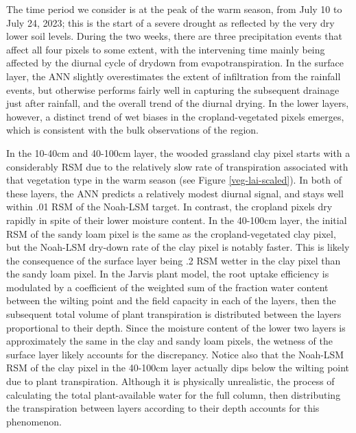 The time period we consider is at the peak of the warm season, from July 10 to July 24, 2023; this is the start of a severe drought as reflected by the very dry lower soil levels. During the two weeks, there are three precipitation events that affect all four pixels to some extent, with the intervening time mainly being affected by the diurnal cycle of drydown from evapotranspiration. In the surface layer, the ANN slightly overestimates the extent of infiltration from the rainfall events, but otherwise performs fairly well in capturing the subsequent drainage just after rainfall, and the overall trend of the diurnal drying. In the lower layers, however, a distinct trend of wet biases in the cropland-vegetated pixels emerges, which is consistent with the bulk observations of the region.

In the 10-40cm and 40-100cm layer, the wooded grassland clay pixel starts with a considerably RSM due to the relatively slow rate of transpiration associated with that vegetation type in the warm season (see Figure \ref{veg-lai-scaled}). In both of these layers, the ANN predicts a relatively modest diurnal signal, and stays well within .01 RSM of the Noah-LSM target. In contrast, the cropland pixels dry rapidly in spite of their lower moisture content. In the 40-100cm layer, the initial RSM of the sandy loam pixel is the same as the cropland-vegetated clay pixel, but the Noah-LSM dry-down rate of the clay pixel is notably faster. This is likely the consequence of the surface layer being .2 RSM wetter in the clay pixel than the sandy loam pixel. In the Jarvis plant model, the root uptake efficiency is modulated by a coefficient of the weighted sum of the fraction water content between the wilting point and the field capacity in each of the layers, then the subsequent total volume of plant transpiration is distributed between the layers proportional to their depth. Since the moisture content of the lower two layers is approximately the same in the clay and sandy loam pixels, the wetness of the surface layer likely accounts for the discrepancy. Notice also that the Noah-LSM RSM of the clay pixel in the 40-100cm layer actually dips below the wilting point due to plant transpiration. Although it is physically unrealistic, the process of calculating the total plant-available water for the full column, then distributing the transpiration between layers according to their depth accounts for this phenomenon.


